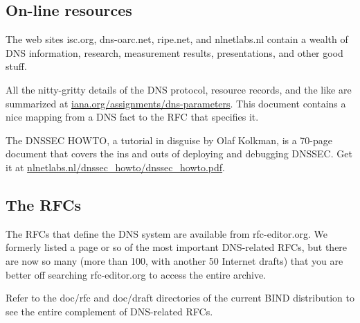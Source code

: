 \protect\hypertarget{part0024_split_075.html}{}{}

\hypertarget{part0024_split_075.htmlux5cux23_idContainer1069}{}
\hypertarget{part0024_split_075.htmlux5cux23calibre_pb_74}{%
\subsection[On-line
resources]{\texorpdfstring{\protect\hypertarget{part0024_split_075.htmlux5cux23_idTextAnchor969}{}{}On-line
resources}{On-line resources}}\label{part0024_split_075.htmlux5cux23calibre_pb_74}}

The web sites isc.org, dns-oarc.net, ripe.net, and nlnetlabs.nl contain
a wealth of DNS information, research, measurement results,
presentations, and other good stuff.

All the nitty-gritty details of the DNS protocol, resource records, and
the like are summarized at
\href{http://iana.org/assignments/dns-parameters}{iana.org/assignments/dns-parameters}.
This document contains a nice mapping from a DNS fact to the RFC that
specifies it.

The {DNSSEC HOWTO}, a tutorial in disguise by Olaf Kolkman, is a 70-page
document that covers the ins and outs of deploying and debugging DNSSEC.
Get it at
\href{http://nlnetlabs.nl/dnssec_howto/dnssec_howto.pdf}{nlnetlabs.nl/dnssec\_howto/dnssec\_howto.pdf}.

\protect\hypertarget{part0024_split_076.html}{}{}

\hypertarget{part0024_split_076.htmlux5cux23_idContainer1069}{}
\hypertarget{part0024_split_076.htmlux5cux23calibre_pb_75}{%
\subsection[The
RFCs]{\texorpdfstring{\protect\hypertarget{part0024_split_076.htmlux5cux23_idTextAnchor970}{}{}The
RFCs}{The RFCs}}\label{part0024_split_076.htmlux5cux23calibre_pb_75}}

The RFCs that define the DNS system are available from rfc-editor.org.
We formerly listed a page or so of the most important DNS-related RFCs,
but there are now so many (more than 100, with another 50 Internet
drafts) that you are better off searching rfc-editor.org to access the
entire archive.

Refer to the {doc/rfc} and {doc/draft} directories of the current BIND
distribution to see the entire complement of DNS-related RFCs.
